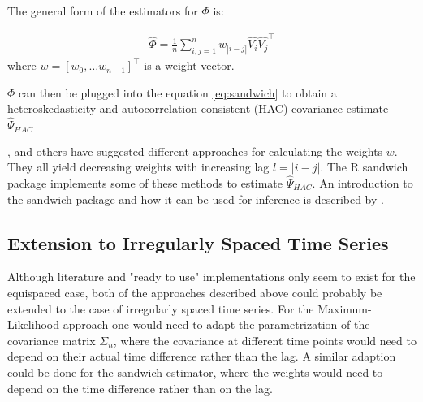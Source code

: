 The general form of the estimators for $\Phi$ is:

\begin{gather*}
\hat{\Phi} = \frac{1}{n} \sum_{i,j=1}^{n} w_{|i-j|}\hat{V_i}\hat{V_j}^{\top}
\end{gather*}
where $w=[w_0, \dots w_{n-1}]^{\top}$ is a weight vector.

$\Phi$ can then be plugged into the equation \ref{eq:sandwich} to obtain a
heteroskedasticity and autocorrelation consistent (HAC) covariance estimate $\hat{\Psi}_{HAC}$

\citeauthor{newey_automatic_1994}, \citeauthor{andrews_heteroskedasticity_1991} and others have suggested different approaches
for calculating the weights $w$. They all yield decreasing weights with increasing lag $l=|i-j|$.
The R sandwich package implements some of these methods to estimate $\hat{\Psi}_{HAC}$.
An introduction to the sandwich package and how it can be used
for inference is described by \citeauthor{zeileis_econometric_2004}.


\subsection{Extension to Irregularly Spaced Time Series}

Although literature and "ready to use" implementations only seem to exist for the equispaced case,
both of the approaches described above could probably be extended to the case of irregularly spaced time series.
For the Maximum-Likelihood approach one would need to adapt the parametrization of the covariance matrix $\Sigma_n$, where
the covariance at different time points would need to depend on their actual time difference rather than the lag.
A similar adaption could be done for the sandwich estimator, where the weights would need to depend on the time
difference rather than on the lag.

